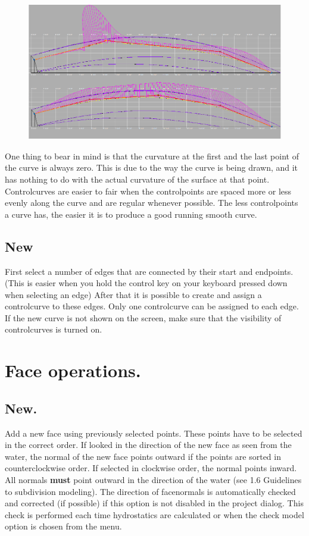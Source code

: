 \documentclass[12pt]{article}
\begin{document}
\begin{figure}[h]
        \centering
        \includegraphics[width=15cm,natwidth=943,natheight=503]{linefairing.png}
        \caption{}
        \label{fig:linefairing}
\end{figure}

One thing to bear in mind is that the curvature at the first and the
last point of the curve is always zero. This is due to the way the
curve is being drawn, and it has nothing to do with the actual
curvature of the surface at that point. Controlcurves are easier to
fair when the controlpoints are spaced more or less evenly along the
curve and are regular whenever possible. The less controlpoints a
curve has, the easier it is to produce a good running smooth curve.

\subsection{New}
First select a number of edges that are connected by their start and
endpoints. (This is easier when you hold the control key on your
keyboard pressed down when selecting an edge) After that it is
possible to create and assign a controlcurve to these edges. Only one
controlcurve can be assigned to each edge. If the new curve is not
shown on the screen, make sure that the visibility of controlcurves is
turned on.

\pagebreak

\section{Face operations.}

\subsection{New.}
Add a new face using previously selected points. These points have to
be selected in the correct order. If looked in the direction of the
new face as seen from the water, the normal of the new face points
outward if the points are sorted in counterclockwise order. If
selected in clockwise order, the normal points inward. All
normals \textbf{must} point outward in the direction of the water (see
1.6 Guidelines to subdivision modeling). The direction of facenormals
is automatically checked and corrected (if possible) if this option is
not disabled in the project dialog. This check is performed each time
hydrostatics are calculated or when the check model option is chosen
from the menu.
\end{document}
